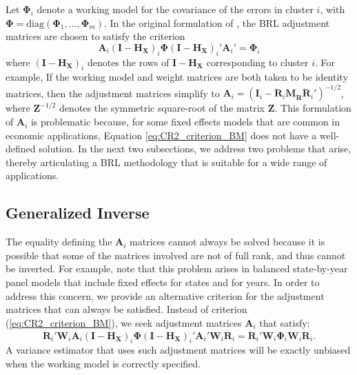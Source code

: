 \documentclass[12pt]{article}\usepackage[]{graphicx}\usepackage[]{color}
\newcommand{\bm}{\mathbf}
\newcommand{\bs}{\boldsymbol}
\begin{document}
Let $\bs\Phi_i$ denote a working model for the covariance of the errors in cluster $i$, with $\bs\Phi = \text{diag}\left(\bs\Phi_1,...,\bs\Phi_m\right)$. In the original formulation of \citet{Bell2002bias}, the BRL adjustment matrices are chosen to satisfy the criterion
\begin{equation}
\label{eq:CR2_criterion_BM}
\bm{A}_i \left(\bm{I} - \bm{H_X}\right)_i \bs\Phi \left(\bm{I} - \bm{H_X}\right)_i' \bm{A}_i'  =  \bs\Phi_i 
\end{equation}
where $\left(\bm{I} - \bm{H_X}\right)_i$ denotes the rows of $\bm{I} - \bm{H_X}$ corresponding to cluster $i$.
For example, If the working model and weight matrices are both taken to be identity matrices, then the adjustment matrices simplify to $\bm{A}_i = \left(\bm{I}_i - \bm{\ddot{R}}_i\bm{M_{\ddot{R}}} \bm{\ddot{R}}_i'\right)^{-1/2}$, where $\bm{Z}^{-1/2}$ denotes the symmetric square-root of the matrix $\bm{Z}$. 
This formulation of $\bm{A}_i$ is problematic because, for some fixed effects models that are common in economic applications, Equation \ref{eq:CR2_criterion_BM} does not have a well-defined solution. 
In the next two subsections, we address two problems that arise, thereby articulating a BRL methodology that is suitable for a wide range of applications.

\subsection{Generalized Inverse}

The equality defining the $\bm{A}_i$ matrices cannot always be solved because it is possible that some of the matrices involved are not of full rank, and thus cannot be inverted. 
For example, \citet{Angrist2009mostly} note that this problem arises in balanced state-by-year panel models that include fixed effects for states and for years. 
In order to address this concern, we provide an alternative criterion for the adjustment matrices that can always be satisfied. 
Instead of criterion (\ref{eq:CR2_criterion_BM}), we seek adjustment matrices $\bm{A}_i$ that satisfy:
\begin{equation}
\label{eq:CR2_criterion}
\bm{\ddot{R}}_i' \bm{W}_i \bm{A}_i \left(\bm{I} - \bm{H_X}\right)_i \bs\Phi \left(\bm{I} - \bm{H_X}\right)_i' \bm{A}_i' \bm{W}_i \bm{\ddot{R}}_i = \bm{\ddot{R}}_i' \bm{W}_i \bs\Phi_i \bm{W}_i \bm{\ddot{R}}_i.
\end{equation}
A variance estimator that uses such adjustment matrices will be exactly unbiased when the working model is correctly specified.
\end{document}
